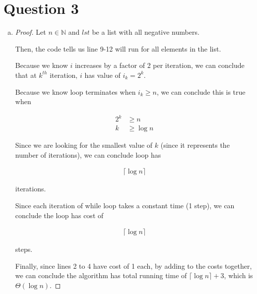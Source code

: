 \documentclass[12pt]{article}
\begin{document}
\section*{Question 3}
\begin{enumerate}[a.]
    \item

    \begin{proof}
        Let $n \in \mathbb{N}$ and $lst$ be a list with all negative numbers.

        \bigskip

        Then, the code tells us line 9-12 will run for all elements in the list.

        \bigskip

        Because we know $i$ increases by a factor of 2 per iteration, we can conclude
        that at $k^{th}$ iteration, $i$ has value of $i_k = 2^k$.

        \bigskip

        Because we know loop terminates when $i_k \geq n$, we can conclude this is true
        when

        \setcounter{equation}{0}
        \begin{align}
            2^k &\geq n\\
            k &\geq \log n
        \end{align}

        Since we are looking for the smallest value of $k$ (since it represents the
        number of iterations), we can conclude loop has

        \begin{align}
            \lceil \log n \rceil
        \end{align}

        iterations.

        \bigskip

        Since each iteration of while loop takes a constant time (1 step), we can
        conclude the loop has cost of

        \begin{align}
            \lceil \log n \rceil
        \end{align}

        steps.

        \bigskip

        Finally, since lines 2 to 4 have cost of 1 each, by adding to the costs together,
        we can conclude the algorithm has total running time of $\lceil \log n \rceil + 3$,
        which is $\Theta(\log n)$.
    \end{proof}


\end{enumerate}
\end{document}
